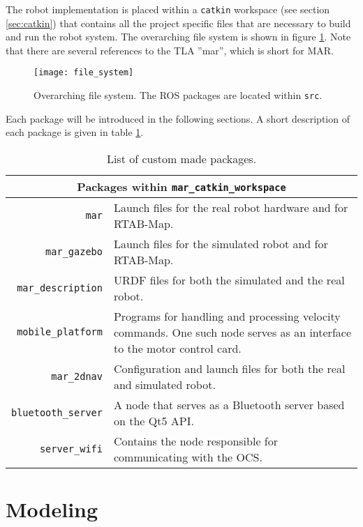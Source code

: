 The robot implementation is placed within a \texttt{catkin} workspace (see section \ref{sec:catkin}) that contains all the project specific files that are necessary to build and run the robot system. The overarching file system is shown in figure \ref{fig:file_system}. Note that there are several references to the \ac{TLA} ''mar'', which is short for \ac{MAR}.

\begin{figure}[h]
	\centering
	\texttt{[image: file\_system]}
	\caption{Overarching file system. The \ac{ROS} packages are located within \texttt{src}.}
	\label{fig:file_system}
\end{figure}

Each package will be introduced in the following sections. A short description of each package is given in table \ref{tab:list_packages}.

\begin{table}
	\centering
	\begin{tabular}{ r p{8.5cm} }
		\hline
		\multicolumn{2}{c}{Packages within \texttt{mar\_catkin\_workspace}}\\
		\hline
		\texttt{mar} & Launch files for the real robot hardware and for \ac{RTAB-Map}.\\
		\texttt{mar\_gazebo} & Launch files for the simulated robot and for \ac{RTAB-Map}.\\
		\texttt{mar\_description} & \ac{URDF} files for both the simulated and the real robot.\\
		\texttt{mobile\_platform} & Programs for handling and processing velocity commands. One such node serves as an interface to the motor control card.\\
		\texttt{mar\_2dnav} & Configuration and launch files for both the real and simulated robot.\\
		\texttt{bluetooth\_server} & A node that serves as a Bluetooth server based on the Qt5 API.\\
		\texttt{server\_wifi} & Contains the node responsible for communicating with the \ac{OCS}.\\
		\hline
	\end{tabular}
	\caption{List of custom made packages.}\label{tab:list_packages}
\end{table}


\section{Modeling}

